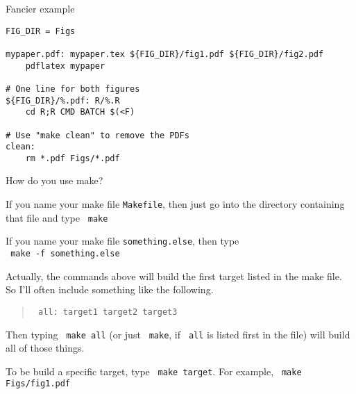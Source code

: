 \documentclass[12pt,t]{beamer}
\begin{document}
\begin{frame}[fragile]{Fancier example}

\begin{semiverbatim}
\begin{lstlisting}
FIG_DIR = Figs

mypaper.pdf: mypaper.tex ${FIG_DIR}/fig1.pdf ${FIG_DIR}/fig2.pdf
    pdflatex mypaper

# One line for both figures
${FIG_DIR}/%.pdf: R/%.R
    cd R;R CMD BATCH $(<F)

# Use "make clean" to remove the PDFs
clean:
    rm *.pdf Figs/*.pdf
\end{lstlisting}
\end{semiverbatim}

\end{frame}



\begin{frame}[fragile]{How do you use make?}

\vspace{6pt}

{\small
\bi
\item If you name your make file {\tt Makefile}, then just go into the
directory containing that file and type {\tt \color{hilit} make}

\item If you name your make file {\tt something.else}, then type \\
{\tt \color{hilit} make -f something.else}

\item Actually, the commands above will build the {\color{vhilit} first}
  target listed in the make file. So I'll often include something like
  the following.

\begin{quote}
{\tt \color{hilit} all: target1 target2 target3}
\end{quote}

  Then typing {\tt \color{hilit} make all} (or just {\tt
    \color{hilit} make}, if {\tt \color{hilit} all} is listed
  first in the file) will build all of those
  things.

\item To be build a specific target, type {\tt \color{hilit} make target}.
  For example, {\tt \color{hilit} make Figs/fig1.pdf}
\ei
}

\end{frame}
\end{document}
